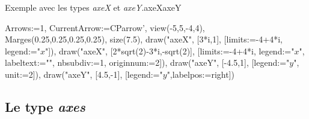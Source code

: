 \begin{demo}{Exemple avec les types \emph{axeX} et \emph{axeY}.}{axeXaxeY}
\begin{texgraph}[name=axeXaxeY]
Arrows:=1, CurrentArrow:=CParrow', view(-5,5,-4,4), 
Marges(0.25,0.25,0.25,0.25), size(7.5),
draw("axeX", [3*i,1], [limits:=-4+4*i, legend:="$x$"]),
draw("axeX", [2*sqrt(2)-3*i,-sqrt(2)],
 [limits:=-4+4*i, legend:="$x$", labeltext:="", 
  nbsubdiv:=1, originnum:=2]),
draw("axeY", [-4.5,1], [legend:="$y$", unit:=2]),
draw("axeY", [4.5,-1], [legend:="$y$",labelpos:=right])
\end{texgraph}
\end{demo}

\subsection{Le type \emph{axes}}\label{typeaxes}

{\centering {}\par}

